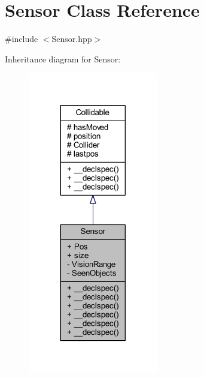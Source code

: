 \hypertarget{class_sensor}{\section{Sensor Class Reference}
\label{class_sensor}
}


{\ttfamily \#include $<$Sensor.\-hpp$>$}



Inheritance diagram for Sensor\-:\nopagebreak
\begin{figure}[H]
\begin{center}
\leavevmode
\includegraphics[width=161pt]{class_sensor__inherit__graph}
\end{center}
\end{figure}


